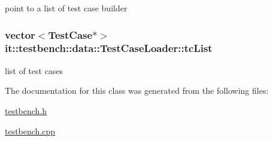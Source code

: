 point to a list of test case builder \hypertarget{classit_1_1testbench_1_1data_1_1TestCaseLoader_a69e04f628e711e7a06592664f510b061}{
\subsubsection[{tc\-List}]{\setlength{\rightskip}{0pt plus 5cm}vector$<${\bf Test\-Case}$\ast$$>$ it\-::testbench\-::data\-::\-Test\-Case\-Loader\-::tc\-List\hspace{0.3cm}{\ttfamily [private]}}}\label{df/dca/classit_1_1testbench_1_1data_1_1TestCaseLoader_a69e04f628e711e7a06592664f510b061}
list of test cases 

The documentation for this class was generated from the following files\-:\begin{DoxyCompactItemize}
\item 
\hyperlink{testbench_8h}{testbench.\-h}\item 
\hyperlink{testbench_8cpp}{testbench.\-cpp}\end{DoxyCompactItemize}
